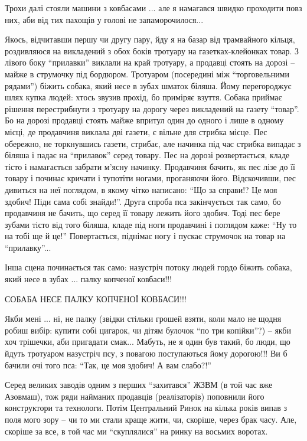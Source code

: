 Трохи далі стояли машини з ковбасами ... але я намагався швидко проходити повз
них, аби від тих пахощів у голові не запаморочилося...

Якось, відчитавши першу чи другу пару, йду я на базар від трамвайного
кільця, роздивляюся на викладений з обох боків тротуару на
газетках-клейонках товар. З лівого боку \enquote{прилавки} виклали на край тротуару,
а продавці стоять на дорозі – майже в струмочку під бордюром. Тротуаром
(посередині між \enquote{торговельними рядами}) біжить собака, який несе в зубах
шматок біляша. Йому перегороджує шлях купка людей: хтось звузив прохід, бо
приміряє взуття. Собака приймає рішення перестрибнути з тротуару на дорогу
через викладений на газету \enquote{товар}. Бо на дорозі продавці стоять майже
впритул один до одного і лише в одному місці, де продавчиня виклала дві
газети, є вільне для стрибка місце. Пес обережно, не торкнувшись газети,
стрибає, але начинка під час стрибка випадає з біляша і падає на \enquote{прилавок}
серед товару. Пес на дорозі розвертається, кладе тісто і намагається забрати
м’ясну начинку. Продавчиня бачить, як пес лізе до її товару і починає
кричати і тупотіти ногами, проганяючи його. Відскочивши, пес дивиться на неї
поглядом, в якому чітко написано: \enquote{Що за справи!? Це моя здобич! Піди сама собі знайди!}. 
Друга спроба пса закінчується так само, бо продавчиня не
бачить, що серед її товару лежить його здобич. Тоді пес бере зубами тісто
від того біляша, кладе під ноги продавчині і поглядом каже: \enquote{Ну то на тобі
ще й це!} Повертається, піднімає ногу і пускає струмочок на товар на
\enquote{прилавку}...

Інша сцена починається так само: назустріч потоку людей гордо біжить собака,
який несе в зубах ... палку копченої ковбаси!!!

СОБАБА НЕСЕ ПАЛКУ КОПЧЕНОЇ КОВБАСИ!!!

Якби мені ... ні, не палку (звідки стільки грошей взяти, коли мало не щодня
робиш вибір: купити собі цигарок, чи дітям булочок \enquote{по три копійки}?) – якби
хоч трішечки, аби пригадати смак... Мабуть, не я один був такий, бо люди, що
йдуть тротуаром назустріч псу, з повагою поступаються йому дорогою!!! Ви б
бачили очі того пса: \enquote{Так, це моя здобич! А вам слабо?!}

Серед великих заводів одним з перших \enquote{захитався} ЖЗВМ (в той час вже
Азовмаш), тож ряди найманих продавців (реалізаторів) поповнили його
конструктори та технологи.  Потім Центральний Ринок на кілька років випав з
поля мого зору – чи то ми стали краще жити, чи, скоріше, через брак часу.
Але, скоріше за все, в той час ми \enquote{скуплялися} на ринку на восьмих воротах.

